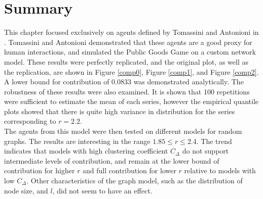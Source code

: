 \section{Summary}

This chapter focused exclusively on agents defined by Tomassini and Antonioni in \cite{RN49}. Tomassini and Antonioni demonstrated that these agents are a good proxy for human interactions, and simulated the Public Goods Game on a custom network model. These results were perfectly replicated, and the original plot, as well as the replication, are shown in Figure \ref{comp0}, Figure \ref{comp1}, and Figure \ref{comp2}. A lower bound for contribution of 0.0833 was demonstrated analytically. The robustness of these results were also examined. It is shown that 100 repetitions were sufficient to estimate the mean of each series, however the empirical quantile plots showed that there is quite high variance in distribution for the series corresponding to $r=2.2$.\\ 

The agents from this model were then tested on different models for random graphs. The results are interesting in the range $1.85\leq r \leq 2.4$. The trend indicates that models with high clustering coefficient $C_\Delta$ do not support intermediate levels of contribution, and remain at the lower bound of contribution for higher $r$ and full contribution for lower $r$ relative to models with low $C_\Delta$. Other characteristics of the graph model, such as the distribution of node size, and $l$, did not seem to have an effect. \\



